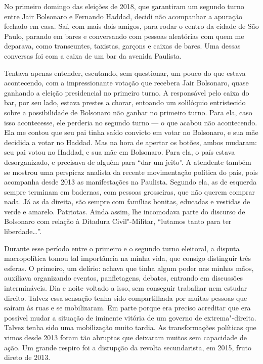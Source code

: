 No primeiro domingo das eleições de 2018, que garantiram um segundo
turno entre Jair Bolsonaro e Fernando Haddad, decidi não acompanhar a
apuração fechado em casa. Saí, com mais dois amigos, para rodar o centro
da cidade de São Paulo, parando em bares e conversando com pessoas
aleatórias com quem me deparava, como transeuntes, taxistas, garçons e
caixas de bares. Uma dessas conversas foi com a caixa de um bar da
avenida Paulista.

Tentava apenas entender, escutando, sem questionar, um pouco do que
estava acontecendo, com a impressionante votação que recebera Jair
Bolsonaro, quase ganhando a eleição presidencial no primeiro turno. A
responsável pelo caixa do bar, por seu lado, estava prestes a chorar,
entoando um solilóquio entristecido sobre a possibilidade de Bolsonaro
não ganhar no primeiro turno. Para ela, caso isso acontecesse, ele
perderia no segundo turno --- o que acabou não acontecendo. Ela me contou
que seu pai tinha saído convicto em votar no Bolsonaro, e sua mãe
decidida a votar no Haddad. Mas na hora de apertar os botões, ambos
mudaram: seu pai votou no Haddad, e sua mãe em Bolsonaro. Para ela, o
país estava desorganizado, e precisava de alguém para ``dar um jeito''.
A atendente também se mostrou uma perspicaz analista da recente
movimentação política do país, pois acompanha desde 2013 as
manifestações na Paulista. Segundo ela, as de esquerda sempre terminam
em badernas, com pessoas grosseiras, que não querem comprar nada. Já as
da direita, são sempre com famílias bonitas, educadas e vestidas de
verde e amarelo. Patriotas. Ainda assim, lhe incomodava parte do
discurso de Bolsonaro com relação à Ditadura Civil"-Militar, ``lutamos tanto
para ter liberdade\ldots{}''.

Durante esse período entre o primeiro e o segundo turno eleitoral, a
disputa macropolítica tomou tal importância na minha vida, que consigo
distinguir três esferas. O primeiro, um delírio: achava que tinha algum
poder nas minhas mãos, auxiliava organizando eventos, panfletagens, debates,
entrando em discussões intermináveis. Dia e noite voltado a isso, sem
conseguir trabalhar nem estudar direito. Talvez essa sensação tenha sido
compartilhada por muitas pessoas que saíram às ruas e se mobilizaram. Em
parte porque era preciso acreditar que era possível mudar a situação de
iminente vitória de um governo de extrema"-direita. Talvez tenha sido uma
mobilização muito tardia. As transformações políticas que vimos desde
2013 foram tão abruptas que deixaram muitos sem capacidade de ação. Um
grande respiro foi a disrupção da revolta secundarista, em 2015, fruto
direto de 2013.

